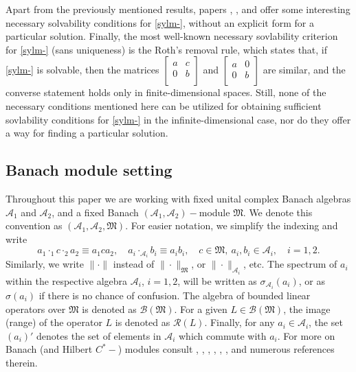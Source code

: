 \documentclass{article}
\theoremstyle{definition}
\def\R{{\mathcal{R}}}
\def\A{{\mathcal{A}}}
\def\B{{\mathcal{B}}}
\def\M{\mathfrak{M}}
\newcommand{\mat}[4]{\left[\begin{array}{cc}#1 & #2 \\ #3 & #4 \\
	\end{array}\right]}
\begin{document}
Apart from the previously mentioned results, papers \cite{BD1}, \cite{BDZG}, and \cite{HC} offer some interesting necessary solvability conditions for \eqref{sylm-}, without an explicit form for a particular solution. Finally, the most well-known necessary sovlability criterion for \eqref{sylm-} (sans uniqueness) is the Roth's removal rule, which states that, if \eqref{sylm-} is solvable, then the matrices
$\mat{a}{c}{0}{b}$ and $\mat{a}{0}{0}{b}$ are similar, and the converse statement holds only in finite-dimensional spaces. Still, none of the necessary conditions mentioned here can be utilized for obtaining sufficient sovlability conditions for \eqref{sylm-} in the infinite-dimensional case, nor do they offer a way for finding a particular solution.

\subsection{Banach module setting}

Throughout this paper we are working with fixed unital complex Banach algebras $\A_1$ and $\A_2$, and a fixed Banach  $(\A_1,\A_2)-$module $\M$. We denote this convention as $(\A_1,\A_2,\M)$. For easier notation, we simplify the indexing and write
$$a_1\cdot_1c\cdot_2a_2\equiv a_1ca_2,\quad a_i\cdot_{\A_i}b_i\equiv a_ib_i,\quad c\in\M,\  a_i,b_i\in\A_i,\quad i=1,2.$$
Similarly, we write $\|\cdot\|$ instead of $\|\cdot\|_{\M}$, or $\|\cdot\|_{\A_i}$, etc. The spectrum of $a_i$ within the respective algebra $\A_i$, $i=1,2$, will be written as $\sigma_{\A_i}(a_i)$, or as $\sigma(a_i)$ if there is no chance of confusion.   The algebra of bounded linear operators over $\M$ is denoted as $\B(\M)$. For a given $L\in\B(\M)$, the image (range) of the operator $L$ is denoted as $\R(L)$. Finally, for any $a_i\in\A_i$, the set $(a_i)'$ denotes the set of elements in $\A_i$ which commute with $a_i$. For more on Banach (and Hilbert $C^*-$) modules consult  \cite{Trap},  \cite{BDI}, \cite{BIT}, \cite{Bel}, \cite{BDZG}, \cite{ZMREMMFM}, and numerous references therein.\\
\end{document}
